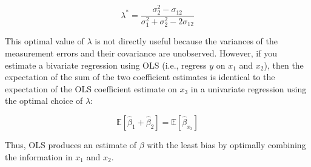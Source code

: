 \[
\lambda^* = \frac{\sigma_2^2 - \sigma_{12}}{\sigma_1^2 + \sigma_2^2 - 2\sigma_{12}}
\]

This optimal value of \(\lambda\) is not directly useful because the variances of the measurement errors and their covariance are unobserved. However, if you estimate a bivariate regression using OLS (i.e., regress \(y\) on \(x_1\) and \(x_2\)), then the expectation of the sum of the two coefficient estimates is identical to the expectation of the OLS coefficient estimate on \(x_3\) in a univariate regression using the optimal choice of \(\lambda\):

\[
\mathbb{E} \left[ \hat{\beta}_1 + \hat{\beta}_2 \right] = \mathbb{E} \left[ \hat{\beta}_{x_3} \right]
\]

Thus, OLS produces an estimate of \(\beta\) with the least bias by optimally combining the information in \(x_1\) and \(x_2\).
